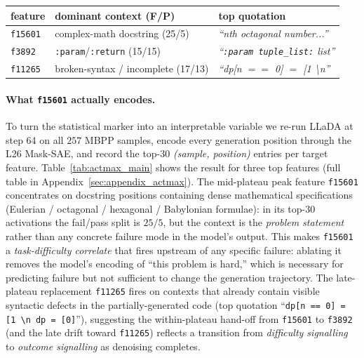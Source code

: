 \documentclass[11pt]{article}
\makeatletter
\renewcommand{\arraystretch}{0.96}
\providecommand{\linenumbers}{}
\providecommand{\nolinenumbers}{}
\let\old@table\table
\let\old@endtable\endtable
\renewenvironment{table}[1][]{%
  \nolinenumbers\old@table[#1]%
}{%
  \old@endtable\linenumbers%
}
\makeatother
\begin{document}
\begin{table}[!t]
  \centering\scriptsize
  \setlength{\tabcolsep}{3pt}
  \renewcommand{\arraystretch}{1.05}
  \begin{tabular}{@{}l p{} p{}@{}}
    \toprule
    feature & dominant context (F/P) & top quotation \\
    \midrule
    \texttt{f15601} & complex-math docstring (25/5) & \emph{``nth octagonal number...''} \\
    \texttt{f3892}  & \texttt{:param}/\texttt{:return} (15/15) & \emph{``\texttt{:param tuple\_list:} list''} \\
    \texttt{f11265} & broken-syntax / incomplete (17/13) & \emph{``dp[n $==$ 0] $=$ [1 \textbackslash n''} \\
    \bottomrule
  \end{tabular}
  \caption{Activation-maximising contexts (top-$30$ \emph{(sample, position)} entries per feature) on LLaDA-8B / MBPP, step 64. \texttt{f15601} concentrates on complex-math docstrings, fail/pass split $25/5$. \texttt{f11265} fires on already broken syntax. Full table including \texttt{f5561}, \texttt{f2144} in Appendix~\ref{sec:appendix_actmax}.}
  \label{tab:actmax_main}
\end{table}

\paragraph{What \texttt{f15601} actually encodes.}
\label{sec:actmax_main}
To turn the statistical marker into an interpretable variable we re-run LLaDA at step 64 on all $257$ MBPP samples, encode every generation position through the L26 Mask-SAE, and record the top-$30$ \emph{(sample, position)} entries per target feature.
Table~\ref{tab:actmax_main} shows the result for three top features (full table in Appendix~\ref{sec:appendix_actmax}).
The mid-plateau peak feature \texttt{f15601} concentrates on docstring positions containing dense mathematical specifications (Eulerian / octagonal / hexagonal / Babylonian formulae): in its top-$30$ activations the fail/pass split is $25/5$, but the context is the \emph{problem statement} rather than any concrete failure mode in the model's output.
This makes \texttt{f15601} a \emph{task-difficulty correlate} that fires upstream of any specific failure: ablating it removes the model's encoding of ``this problem is hard,'' which is necessary for predicting failure but not sufficient to change the generation trajectory.
The late-plateau replacement \texttt{f11265} fires on contexts that already contain visible syntactic defects in the partially-generated code (top quotation ``\texttt{dp[n == 0] = [1 \textbackslash n dp = [0]}''), suggesting the within-plateau hand-off from \texttt{f15601} to \texttt{f3892} (and the late drift toward \texttt{f11265}) reflects a transition from \emph{difficulty signalling} to \emph{outcome signalling} as denoising completes.
\end{document}
